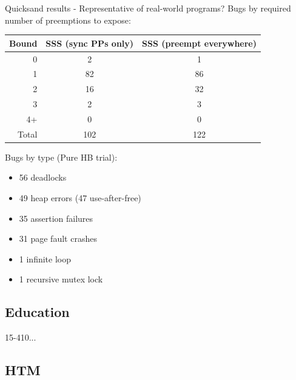 \documentclass[xcolor=dvipsnames]{beamer}
\begin{document}
\begin{frame}{Quicksand results - Representative of real-world programs?}
	Bugs by required number of preemptions to expose:
	\begin{center}
		\footnotesize
	\begin{tabular}{r|c|c}
		{\bf Bound} & {\bf SSS (sync PPs only)} & {\bf SSS (preempt everywhere)} \\
		\hline
		0       & 2     & 1     \\
		1       & 82    & 86    \\
		2       & 16    & 32    \\
		3       & 2     & 3     \\
		4+      & 0     & 0     \\
		\hline
		Total   & 102   & 122   \\
	\end{tabular}
	\end{center}
	\linegap

	Bugs by type (Pure HB trial):
	\begin{itemize}
		\item 56 deadlocks
		\item 49 heap errors (47 use-after-free)
		\item 35 assertion failures
		\item 31 page fault crashes
		\item 1 infinite loop
		\item 1 recursive mutex lock
	\end{itemize}
\end{frame}

\subsection{Education}

\begin{frame}{15-410...}
\end{frame}

\subsection{HTM}
\end{document}

